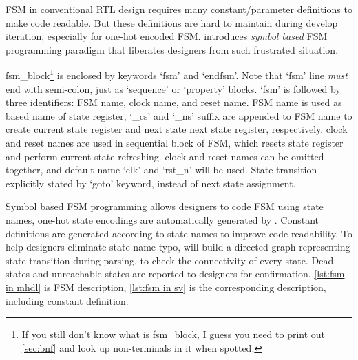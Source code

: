 FSM in conventional RTL design requires many
constant/parameter definitions to make code readable. But these
definitions are hard to maintain during develop iteration, especially
for one-hot encoded FSM. \mhdl{} introduces \emph{symbol based} FSM
programming paradigm that liberates designers from such frustrated
situation.

fsm\_block\footnote{If you still don't know what is fsm\_block, I
guess you need to print out
\autoref{sec:bnf} and look up non-terminals in it when spotted.}
is enclosed by keywords `fsm' and `endfsm'. Note that `fsm'
line \emph{must} end with semi-colon, just as \sv{} `sequence' or
`property' blocks. `fsm' is followed by three identifiers: FSM name,
clock name, and reset name. FSM name is used as based name of state
register, `\_cs' and `\_ns' suffix are appended to FSM name to create
current state register and next state next state register,
respectively. clock and reset names are used in sequential block of
FSM, which resets state register and perform current state
refreshing. clock and reset names can be omitted together, and default
name `clk' and `rst\_n' will be used. State transition explicitly
stated by `goto' keyword, instead of next state assignment.

Symbol based FSM programming allows designers to code FSM using
state names, one-hot state encodings are automatically generated
by \mhdlc{}. Constant definitions are generated according to state
names to improve code readability. To help designers eliminate state
name typo, \mhdlc{} will build a directed graph representing state
transition during parsing, to check the connectivity of every state. Dead
states and unreachable states are reported to designers for
confirmation. \autoref{lst:fsm in mhdl} is \mhdl{} FSM description,
\autoref{lst:fsm in sv} is the corresponding \sv{} description, including
constant definition. 

